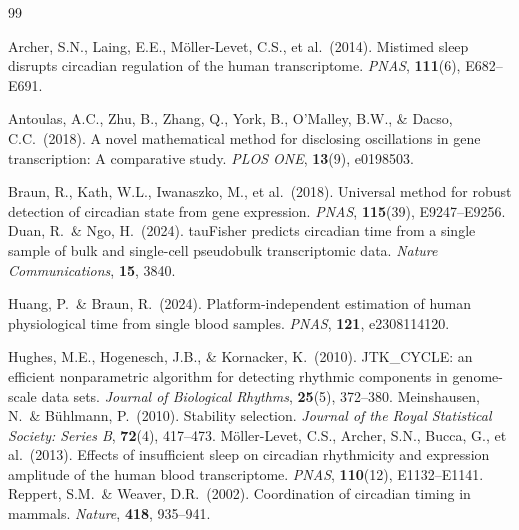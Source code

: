 \documentclass[10pt,a4paper]{article}
\begin{document}

\begin{thebibliography}{99}
\small
\setlength{\itemsep}{0pt}
\setlength{\parskip}{3pt}

Archer, S.N., Laing, E.E., Möller-Levet, C.S., et al.\ (2014).
Mistimed sleep disrupts circadian regulation of the human
transcriptome.
\emph{PNAS}, \textbf{111}(6), E682--E691.

Antoulas, A.C., Zhu, B., Zhang, Q., York, B., O'Malley, B.W.,
\& Dacso, C.C.\ (2018).
A novel mathematical method for disclosing oscillations in gene
transcription: A comparative study.
\emph{PLOS ONE}, \textbf{13}(9), e0198503.

Braun, R., Kath, W.L., Iwanaszko, M., et al.\ (2018).
Universal method for robust detection of circadian state from gene
expression.
\emph{PNAS}, \textbf{115}(39), E9247--E9256.
Duan, R.\ \& Ngo, H.\ (2024).
tauFisher predicts circadian time from a single sample of bulk and
single-cell pseudobulk transcriptomic data.
\emph{Nature Communications}, \textbf{15}, 3840.

Huang, P.\ \& Braun, R.\ (2024).
Platform-independent estimation of human physiological time from
single blood samples.
\emph{PNAS}, \textbf{121}, e2308114120.

Hughes, M.E., Hogenesch, J.B., \& Kornacker, K.\ (2010).
JTK\_CYCLE: an efficient nonparametric algorithm for detecting
rhythmic components in genome-scale data sets.
\emph{Journal of Biological Rhythms}, \textbf{25}(5), 372--380.
Meinshausen, N.\ \& B\"uhlmann, P.\ (2010).
Stability selection.
\emph{Journal of the Royal Statistical Society: Series B},
\textbf{72}(4), 417--473.
Möller-Levet, C.S., Archer, S.N., Bucca, G., et al.\ (2013).
Effects of insufficient sleep on circadian rhythmicity and
expression amplitude of the human blood transcriptome.
\emph{PNAS}, \textbf{110}(12), E1132--E1141.
Reppert, S.M.\ \& Weaver, D.R.\ (2002).
Coordination of circadian timing in mammals.
\emph{Nature}, \textbf{418}, 935--941.


\end{thebibliography}
\end{document}
